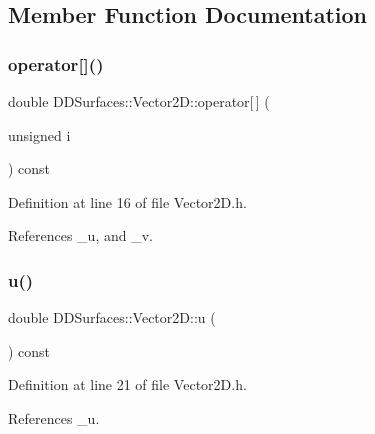 \subsection{Member Function Documentation}
\hypertarget{class_d_d_surfaces_1_1_vector2_d_abcf44b3d1da1b91edbb44bd9af43c65b}{}\label{class_d_d_surfaces_1_1_vector2_d_abcf44b3d1da1b91edbb44bd9af43c65b} 
\subsubsection{\texorpdfstring{operator[]()}{operator[]()}}
{\footnotesize\ttfamily double D\+D\+Surfaces\+::\+Vector2\+D\+::operator\mbox{[}$\,$\mbox{]} (\begin{DoxyParamCaption}\item[{unsigned}]{i }\end{DoxyParamCaption}) const\hspace{0.3cm}{\ttfamily [inline]}}



Definition at line 16 of file Vector2\+D.\+h.



References \+\_\+u, and \+\_\+v.

\hypertarget{class_d_d_surfaces_1_1_vector2_d_a524469b7edcbcafa2bb633c88e755818}{}\label{class_d_d_surfaces_1_1_vector2_d_a524469b7edcbcafa2bb633c88e755818} 
\subsubsection{\texorpdfstring{u()}{u()}\hspace{0.1cm}{\footnotesize\ttfamily [1/2]}}
{\footnotesize\ttfamily double D\+D\+Surfaces\+::\+Vector2\+D\+::u (\begin{DoxyParamCaption}{ }\end{DoxyParamCaption}) const\hspace{0.3cm}{\ttfamily [inline]}}



Definition at line 21 of file Vector2\+D.\+h.



References \+\_\+u.



